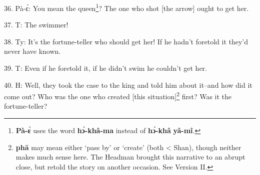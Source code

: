 36. Pà-ɛ́: You mean the queen\footnote{\textbf{Pà-ɛ́} uses the word \textbf{hɔ́-khâ-ma} instead of \textbf{hɔ́-khâ} \textbf{yâ-mî}.}? The one who shot [the arrow] ought to get
her.

37. T: The swimmer!

38. Ty: It's the fortune-teller who should get her! If he hadn't foretold it they'd
never have known.

39. T: Even if he foretold it, if he didn't swim he couldn't get her.

40. H: Well, they took the case to the king and told him about it--and how did it
come out? Who was the one who created [this situation]\footnote{\textbf{phā} may mean either `pass by' or `create' (both < Shan), though neither makes much sense here. The Headman brought this narrative to an abrupt close, but retold the story on another occasion. See Version II.} first? Was it the fortune-teller?



